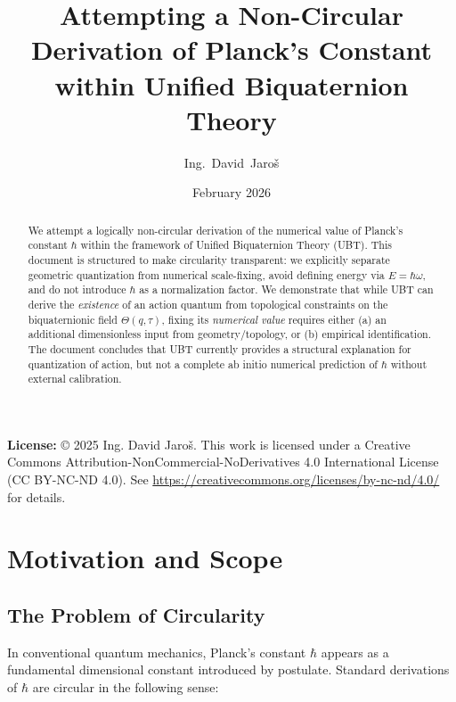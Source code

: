 \documentclass[12pt]{article}
\title{Attempting a Non-Circular Derivation of Planck's Constant\\within Unified Biquaternion Theory}
\author{Ing.~David~Jaroš}
\date{February 2026}
\begin{document}
\maketitle

\noindent
\textbf{License:} © 2025 Ing. David Jaroš. This work is licensed under a Creative Commons Attribution-NonCommercial-NoDerivatives 4.0 International License (CC BY-NC-ND 4.0). See \url{https://creativecommons.org/licenses/by-nc-nd/4.0/} for details.

\vspace{1em}

\begin{abstract}
We attempt a logically non-circular derivation of the numerical value of Planck's constant $\hbar$ within the framework of Unified Biquaternion Theory (UBT). This document is structured to make circularity transparent: we explicitly separate geometric quantization from numerical scale-fixing, avoid defining energy via $E = \hbar\omega$, and do not introduce $\hbar$ as a normalization factor. We demonstrate that while UBT can derive the \emph{existence} of an action quantum from topological constraints on the biquaternionic field $\Theta(q,\tau)$, fixing its \emph{numerical value} requires either (a) an additional dimensionless input from geometry/topology, or (b) empirical identification. The document concludes that UBT currently provides a structural explanation for quantization of action, but not a complete ab initio numerical prediction of $\hbar$ without external calibration.
\end{abstract}

\tableofcontents
\newpage

\section{Motivation and Scope}

\subsection{The Problem of Circularity}

In conventional quantum mechanics, Planck's constant $\hbar$ appears as a fundamental dimensional constant introduced by postulate. Standard derivations of $\hbar$ are circular in the following sense:
\end{document}
